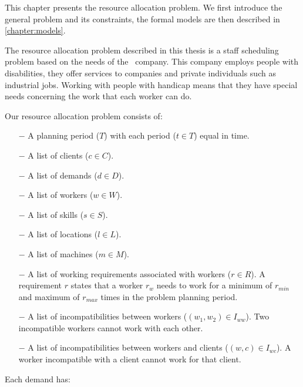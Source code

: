 \documentclass[../thesis.tex]{subfiles}
\begin{document}
This chapter presents the resource allocation problem.
We first introduce the general problem and its constraints, 
the formal models are then described in \autoref{chapter:models}.

The resource allocation problem described in this thesis is a staff scheduling problem based on the needs of the \vone\ company. 
This company employs people with disabilities, they offer services to companies and private individuals such 
as industrial jobs. Working with people with handicap means that they have special needs concerning
the work that each worker can do.




Our resource allocation problem consists of:

\begin{itemize}
  \item[$-$] A planning period ($T$) with each period ($t \in T$) equal in time.
  \item[$-$] A list of clients ($c \in C$). 
  \item[$-$] A list of demands ($d \in D$).
  \item[$-$] A list of workers ($w \in W$). 
  \item[$-$] A list of skills ($s \in S$).
  \item[$-$] A list of locations ($l \in L$).
  \item[$-$] A list of machines ($m \in M$).
  \item[$-$] A list of working requirements associated with workers ($r \in R$). A requirement $r$ states that a worker $r_w$
  needs to work for a minimum of $r_{min}$ and maximum of $r_{max}$ times in the problem planning period.  
  \item[$-$] A list of incompatibilities between workers ($(w_1, w_2) \in I_{ww}$).
  Two incompatible workers cannot work with each other.  
  \item[$-$] A list of incompatibilities between workers and clients ($(w, c) \in I_{wc}$).
  A worker incompatible with a client cannot work for that client.
\end{itemize}

Each demand has:
\end{document}
